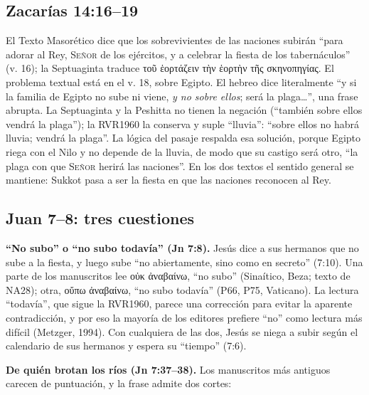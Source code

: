 \documentclass[11pt,letterpaper]{article}
\newcommand{\grc}[1]{\foreignlanguage{ancientgreek}{#1}}
\newcommand{\SENOR}{\textsc{Señor}}
\begin{document}
\subsection{Zacarías 14:16--19}
El Texto Masorético dice que los sobrevivientes de las naciones subirán ``para adorar al Rey, \SENOR{} de los ejércitos, y a celebrar la fiesta de los tabernáculos'' (v. 16); la Septuaginta traduce \grc{τοῦ ἑορτάζειν τὴν ἑορτὴν τῆς σκηνοπηγίας}. El problema textual está en el v. 18, sobre Egipto. El hebreo dice literalmente ``y si la familia de Egipto no sube ni viene, \emph{y no sobre ellos}; será la plaga\ldots'', una frase abrupta. La Septuaginta y la Peshitta no tienen la negación (``también sobre ellos vendrá la plaga''); la RVR1960 la conserva y suple ``lluvia'': ``sobre ellos no habrá lluvia; vendrá la plaga''. La lógica del pasaje respalda esa solución, porque Egipto riega con el Nilo y no depende de la lluvia, de modo que su castigo será otro, ``la plaga con que \SENOR{} herirá las naciones''. En los dos textos el sentido general se mantiene: Sukkot pasa a ser la fiesta en que las naciones reconocen al Rey.

\subsection{Juan 7--8: tres cuestiones}
\textbf{``No subo'' o ``no subo todavía'' (Jn 7:8).} Jesús dice a sus hermanos que no sube a la fiesta, y luego sube ``no abiertamente, sino como en secreto'' (7:10). Una parte de los manuscritos lee \grc{οὐκ ἀναβαίνω}, ``no subo'' (Sinaítico, Beza; texto de NA28); otra, \grc{οὔπω ἀναβαίνω}, ``no subo todavía'' (P66, P75, Vaticano). La lectura ``todavía'', que sigue la RVR1960, parece una corrección para evitar la aparente contradicción, y por eso la mayoría de los editores prefiere ``no'' como lectura más difícil (Metzger, 1994). Con cualquiera de las dos, Jesús se niega a subir según el calendario de sus hermanos y espera su ``tiempo'' (7:6).

\textbf{De quién brotan los ríos (Jn 7:37--38).} Los manuscritos más antiguos carecen de puntuación, y la frase admite dos cortes:
\end{document}
